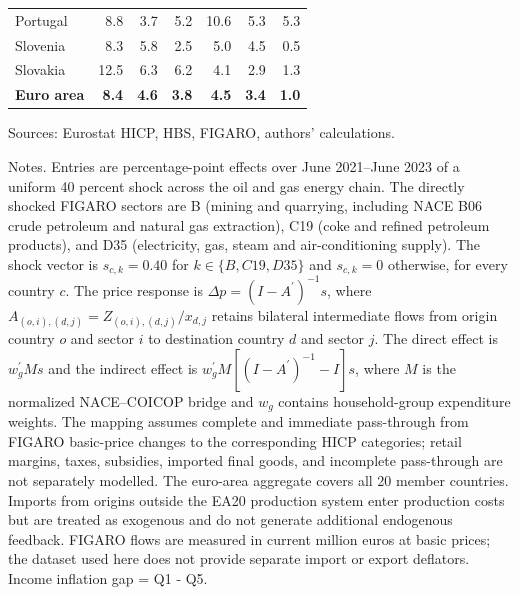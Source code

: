 \documentclass[11pt]{article}
\begin{document}
\begin{table}[H]
\begin{tabular}{lrrrrrr}
 \\
Portugal & 8.8 & 3.7 & 5.2 & 10.6 & 5.3 & 5.3
 \\
Slovenia & 8.3 & 5.8 & 2.5 & 5.0 & 4.5 & 0.5
 \\
Slovakia & 12.5 & 6.3 & 6.2 & 4.1 & 2.9 & 1.3
 \\
\midrule
\textbf{Euro area} & \textbf{8.4} & \textbf{4.6} & \textbf{3.8} & \textbf{4.5} & \textbf{3.4} & \textbf{1.0}
 \\
\bottomrule
\end{tabular}
\par\vspace{0.35em}\footnotesize\noindent Sources: Eurostat HICP, HBS, FIGARO, authors' calculations.
\par\vspace{0.25em}\footnotesize\noindent Notes. Entries are percentage-point effects over June 2021--June 2023 of a uniform 40 percent shock across the oil and gas energy chain. The directly shocked FIGARO sectors are B (mining and quarrying, including NACE B06 crude petroleum and natural gas extraction), C19 (coke and refined petroleum products), and D35 (electricity, gas, steam and air-conditioning supply). The shock vector is $s_{c,k}=0.40$ for $k\in\{B,C19,D35\}$ and $s_{c,k}=0$ otherwise, for every country $c$. The price response is $\Delta p = (I - A^{\prime})^{-1}s$, where $A_{(o,i),(d,j)}=Z_{(o,i),(d,j)}/x_{d,j}$ retains bilateral intermediate flows from origin country $o$ and sector $i$ to destination country $d$ and sector $j$. The direct effect is $w_g^{\prime}Ms$ and the indirect effect is $w_g^{\prime}M[(I-A^{\prime})^{-1}-I]s$, where $M$ is the normalized NACE--COICOP bridge and $w_g$ contains household-group expenditure weights. The mapping assumes complete and immediate pass-through from FIGARO basic-price changes to the corresponding HICP categories; retail margins, taxes, subsidies, imported final goods, and incomplete pass-through are not separately modelled. The euro-area aggregate covers all 20 member countries. Imports from origins outside the EA20 production system enter production costs but are treated as exogenous and do not generate additional endogenous feedback. FIGARO flows are measured in current million euros at basic prices; the dataset used here does not provide separate import or export deflators. Income inflation gap = Q1 - Q5.
\end{table}
\vspace{0.6em}
\end{document}
